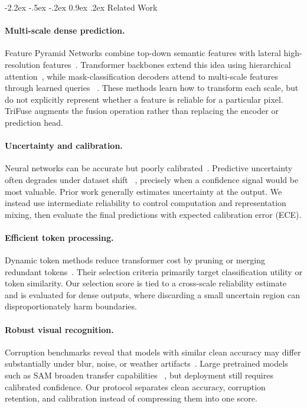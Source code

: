 \documentclass[10pt,twocolumn,letterpaper]{article}
\makeatletter
\newcommand{\method}{TriFuse}
\renewcommand\section{\@startsection{section}{1}{\z@}%
  {-2.2ex \@plus -.5ex \@minus -.2ex}%
  {0.9ex \@plus .2ex}%
  {\normalfont\large\bfseries\color{iccvblue}}}
\makeatother
\begin{document}
\section{Related Work}
\label{sec:related}

\paragraph{Multi-scale dense prediction.}
Feature Pyramid Networks combine top-down semantic features with lateral
high-resolution features~\cite{lin2017fpn}. Transformer backbones extend this
idea using hierarchical attention~\cite{liu2021swin}, while mask-classification
decoders attend to multi-scale features through learned queries
~\cite{cheng2022mask2former}. These methods learn how to transform each scale,
but do not explicitly represent whether a feature is reliable for a particular
pixel. \method{} augments the fusion operation rather than replacing the encoder
or prediction head.

\paragraph{Uncertainty and calibration.}
Neural networks can be accurate but poorly calibrated~\cite{guo2017calibration}.
Predictive uncertainty often degrades under dataset shift
~\cite{ovadia2019uncertainty}, precisely when a confidence signal would be most
valuable. Prior work generally estimates uncertainty at the output. We instead
use intermediate reliability to control computation and representation mixing,
then evaluate the final predictions with expected calibration error (ECE).

\paragraph{Efficient token processing.}
Dynamic token methods reduce transformer cost by pruning or merging redundant
tokens~\cite{rao2021dynamicvit,bolya2023tome}. Their selection criteria primarily
target classification utility or token similarity. Our selection score is tied
to a cross-scale reliability estimate and is evaluated for dense outputs, where
discarding a small uncertain region can disproportionately harm boundaries.

\paragraph{Robust visual recognition.}
Corruption benchmarks reveal that models with similar clean accuracy may differ
substantially under blur, noise, or weather artifacts~\cite{hendrycks2019imagenetc}.
Large pretrained models such as SAM broaden transfer capabilities
~\cite{kirillov2023sam}, but deployment still requires calibrated confidence.
Our protocol separates clean accuracy, corruption retention, and calibration
instead of compressing them into one score.
\end{document}
